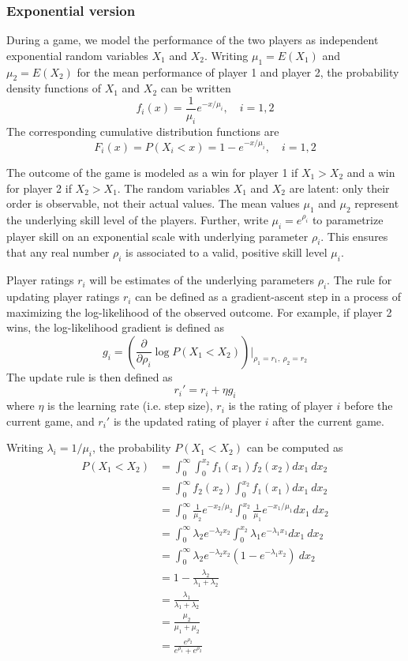\documentclass{article}
\begin{document}
	\subsubsection{Exponential version}
	During a game, we model the performance of the two players as independent exponential random variables $X_1$ and $X_2$. Writing $\mu_1 = E(X_1)$ and $\mu_2 = E(X_2)$ for the mean performance of player 1 and player 2, the probability density functions of $X_1$ and $X_2$ can be written
	$$f_i(x) = \frac1{\mu_i}e^{-x/\mu_i},\quad i=1, 2$$
	The corresponding cumulative distribution functions are
	$$F_i(x) = P(X_i < x) = 1 - e^{-x/\mu_i},\quad i=1, 2$$
	
	The outcome of the game is modeled as a win for player 1 if $X_1 > X_2$ and a win for player 2 if $X_2 > X_1$. The random variables $X_1$ and $X_2$ are latent: only their order is observable, not their actual values. The mean values $\mu_1$ and $\mu_2$ represent the underlying skill level of the players. Further, write $\mu_i = e^{\rho_i}$ to parametrize player skill on an exponential scale with underlying parameter $\rho_i$. This ensures that any real number $\rho_i$ is associated to a valid, positive skill level $\mu_i$. 
	
	Player ratings $r_i$ will be estimates of the underlying parameters $\rho_i$. The rule for updating player ratings $r_i$ can be defined as a gradient-ascent step in a process of maximizing the log-likelihood of the observed outcome. For example, if player 2 wins, the log-likelihood gradient is defined as
	$$g_i = \left(\frac{\partial}{\partial \rho_i} \log P(X_1 < X_2)\right) \bigg|_{\rho_1=r_1,\ \rho_2=r_2}$$
	The update rule is then defined as
	$$r_i' = r_i + \eta g_i$$
	where $\eta$ is the learning rate (i.e. step size), $r_i$ is the rating of player $i$ before the current game, and $r_i'$ is the updated rating of player $i$ after the current game.
	
	Writing $\lambda_i = 1 / \mu_i$, the probability $P(X_1 < X_2)$ can be computed as
	\begin{align*}
	P(X_1 < X_2) &= \int_0^{\infty} \int_0^{x_2} f_1(x_1) f_2(x_2) dx_1\ dx_2 \\
	&= \int_0^{\infty} f_2(x_2) \int_0^{x_2} f_1(x_1) dx_1\ dx_2 \\
	&= \int_0^{\infty} \frac1{\mu_2}e^{-x_2/\mu_2} \int_0^{x_2} \frac1{\mu_1}e^{-x_1/\mu_1} dx_1\ dx_2 \\
	&= \int_0^{\infty} \lambda_2 e^{-\lambda_2 x_2} \int_0^{x_2} \lambda_1 e^{-\lambda_1 x_1} dx_1\ dx_2 \\
	&= \int_0^{\infty} \lambda_2 e^{-\lambda_2 x_2} (1 - e^{-\lambda_1 x_2})\ dx_2 \\
	&= 1 - \frac{\lambda_2}{\lambda_1 + \lambda_2} \\
	&= \frac{\lambda_1}{\lambda_1 + \lambda_2} \\
	&= \frac{\mu_2}{\mu_1 + \mu_2} \\
	&= \frac{e^{\rho_2}}{e^{\rho_1} + e^{\rho_2}}
	\end{align*}
	
\end{document}
